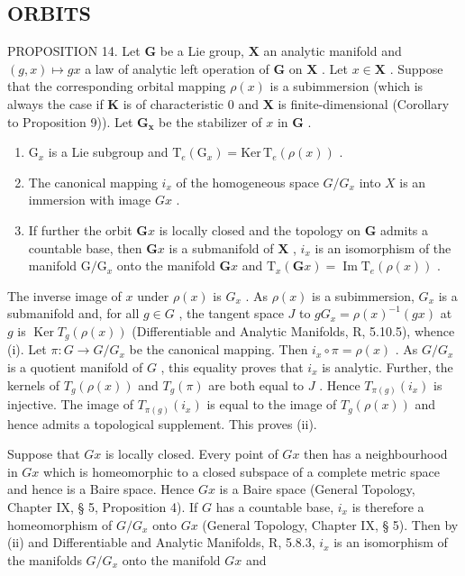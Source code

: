 \subsection{ORBITS}

PROPOSITION 14. Let \(\mathbf{G}\) be a Lie group, \(\mathbf{X}\) an analytic manifold and \((g,x)\mapsto gx\) a law of analytic left operation of \(\mathbf{G}\) on \(\mathbf{X}\) . Let \(x\in \mathbf{X}\) . Suppose that the corresponding orbital mapping \(\rho (x)\) is a subimmersion (which is always the case if \(\mathbf{K}\) is of characteristic 0 and \(\mathbf{X}\) is finite-dimensional (Corollary to Proposition 9)). Let \(\mathbf{G}_{\mathbf{x}}\) be the stabilizer of \(x\) in \(\mathbf{G}\) .

\begin{enumerate}
\def\labelenumi{(\roman{enumi})}
\item
  \(\mathrm{G}_x\) is a Lie subgroup and \(\mathrm{T}_e(\mathrm{G}_x) = \mathrm{Ker}\, \mathrm{T}_e(\rho(x))\) .
\item
  The canonical mapping \(i_x\) of the homogeneous space \(G / G_x\) into \(X\) is an immersion with image \(Gx\) .
\item
  If further the orbit \(\mathbf{G}x\) is locally closed and the topology on \(\mathbf{G}\) admits a countable base, then \(\mathbf{G}x\) is a submanifold of \(\mathbf{X}\) , \(i_x\) is an isomorphism of the manifold \(\mathrm{G} / \mathrm{G}_x\) onto the manifold \(\mathbf{G}x\) and \(\mathrm{T}_x(\mathbf{G}x) = \operatorname{Im} \mathrm{T}_e(\rho(x))\) .
\end{enumerate}

The inverse image of \(x\) under \(\rho(x)\) is \(G_x\) . As \(\rho(x)\) is a subimmersion, \(G_x\) is a submanifold and, for all \(g \in G\) , the tangent space \(J\) to \(gG_x = \rho(x)^{-1}(gx)\) at \(g\) is \(\operatorname{Ker} T_g(\rho(x))\) (Differentiable and Analytic Manifolds, R, 5.10.5), whence (i). Let \(\pi: G \to G/G_x\) be the canonical mapping. Then \(i_x \circ \pi = \rho(x)\) . As \(G/G_x\) is a quotient manifold of \(G\) , this equality proves that \(i_x\) is analytic. Further, the kernels of \(T_g(\rho(x))\) and \(T_g(\pi)\) are both equal to \(J\) . Hence \(T_{\pi(g)}(i_x)\) is injective. The image of \(T_{\pi(g)}(i_x)\) is equal to the image of \(T_g(\rho(x))\) and hence admits a topological supplement. This proves (ii).

Suppose that \(Gx\) is locally closed. Every point of \(Gx\) then has a neighbourhood in \(Gx\) which is homeomorphic to a closed subspace of a complete metric space and hence is a Baire space. Hence \(Gx\) is a Baire space (General Topology, Chapter IX, § 5, Proposition 4). If \(G\) has a countable base, \(i_x\) is therefore a homeomorphism of \(G / G_x\) onto \(Gx\) (General Topology, Chapter IX, § 5). Then by (ii) and Differentiable and Analytic Manifolds, R, 5.8.3, \(i_x\) is an isomorphism of the manifolds \(G / G_x\) onto the manifold \(Gx\) and


